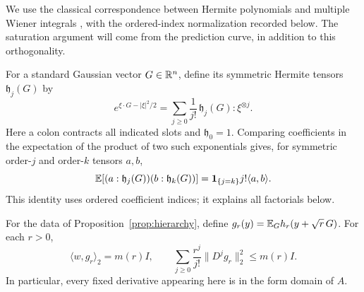 We use the classical correspondence between Hermite polynomials and
multiple Wiener integrals \cite[Sections~3--5]{Ito1951}, with the
ordered-index normalization recorded below.  The saturation argument
will come from the prediction curve, in addition to this orthogonality.

For a standard Gaussian vector $G\in\mathbb R^n$, define its symmetric Hermite
tensors $\mathfrak h_j(G)$ by
\begin{equation}\label{eq:hierarchy-hermite-definition}
 e^{\xi\cdot G-|\xi|^2/2}
 =\sum_{j\ge0}\frac1{j!}\,\mathfrak h_j(G):\xi^{\otimes j}.
\end{equation}
Here a colon contracts all indicated slots and $\mathfrak h_0=1$.
Comparing coefficients in the expectation of the product of two such
exponentials gives, for symmetric order-$j$ and order-$k$ tensors $a,b$,
\begin{equation}\label{eq:hierarchy-hermite-isometry}
 \mathbb E[(a:\mathfrak h_j(G))(b:\mathfrak h_k(G))]
 =\mathbf 1_{\{j=k\}}j!\langle a,b\rangle.
\end{equation}
This identity uses ordered coefficient indices; it explains all factorials
below.

\begin{lemma}\label{lem:hierarchy-bessel}
For the data of Proposition~\ref{prop:hierarchy}, define
$g_r(y)=\mathbb E_G h_r(y+\sqrt r\,G)$.  For each $r>0$,
\begin{equation}\label{eq:hierarchy-bessel}
 \langle w,g_r\rangle_2=m(r)I,\qquad
 \sum_{j\ge0}\frac{r^j}{j!}\|D^jg_r\|_2^2\le m(r)I.
\end{equation}
In particular, every fixed derivative appearing here is in the form
domain of $A$.
\end{lemma}

